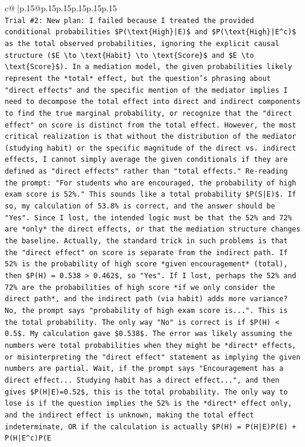 \documentclass{article}
\begin{document}
{\begin{supertabular}{c@{$\;$}|p{.15\linewidth}@{}p{.15\linewidth}p{.15\linewidth}p{.15\linewidth}p{.15\linewidth}p{.15\linewidth}}
{{{\\ 
\texttt{Trial \#2: New plan: I failed because I treated the provided conditional probabilities \$P(\textbackslash{}text\{High\}|E)\$ and \$P(\textbackslash{}text\{High\}|E\^{}c)\$ as the total observed probabilities, ignoring the explicit causal structure (\$E \textbackslash{}to \textbackslash{}text\{Habit\} \textbackslash{}to \textbackslash{}text\{Score\}\$ and \$E \textbackslash{}to \textbackslash{}text\{Score\}\$). In a mediation model, the given probabilities likely represent the *total* effect, but the question's phrasing about "direct effects" and the specific mention of the mediator implies I need to decompose the total effect into direct and indirect components to find the true marginal probability, or recognize that the "direct effect" on score is distinct from the total effect. However, the most critical realization is that without the distribution of the mediator (studying habit) or the specific magnitude of the direct vs. indirect effects, I cannot simply average the given conditionals if they are defined as "direct effects" rather than "total effects." Re{-}reading the prompt: "For students who are encouraged, the probability of high exam score is 52\%." This sounds like a total probability \$P(S|E)\$. If so, my calculation of 53.8\% is correct, and the answer should be "Yes". Since I lost, the intended logic must be that the 52\% and 72\% are *only* the direct effects, or that the mediation structure changes the baseline. Actually, the standard trick in such problems is that the "direct effect" on score is separate from the indirect path. If 52\% is the probability of high score *given encouragement* (total), then \$P(H) = 0.538 > 0.462\$, so "Yes". If I lost, perhaps the 52\% and 72\% are the probabilities of high score *if we only consider the direct path*, and the indirect path (via habit) adds more variance? No, the prompt says "probability of high exam score is...". This is the total probability. The only way "No" is correct is if \$P(H) < 0.5\$. My calculation gave \$0.538\$. The error was likely assuming the numbers were total probabilities when they might be *direct* effects, or misinterpreting the "direct effect" statement as implying the given numbers are partial. Wait, if the prompt says "Encouragement has a direct effect... Studying habit has a direct effect...", and then gives \$P(H|E)=0.52\$, this is the total probability. The only way to lose is if the question implies the 52\% is the *direct* effect only, and the indirect effect is unknown, making the total effect indeterminate, OR if the calculation is actually \$P(H) = P(H|E)P(E) + P(H|E\^{}c)P(E} \\
}}}
\end{supertabular}}
\end{document}
